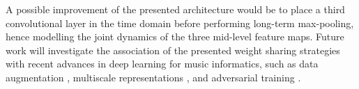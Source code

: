 \documentclass{article}
\begin{document}
A possible improvement of the presented architecture would be to
place a third convolutional layer in the time domain before performing long-term
max-pooling, hence modelling the joint dynamics of the three mid-level feature maps.
Future work will investigate the association of the presented weight sharing strategies
with recent advances in deep learning for music informatics,
such as data augmentation \cite{McFee2015-muda},
multiscale representations \cite{Hamel2012, Anden2015},
and adversarial training \cite{Kereliuk2015}.


\end{document}
